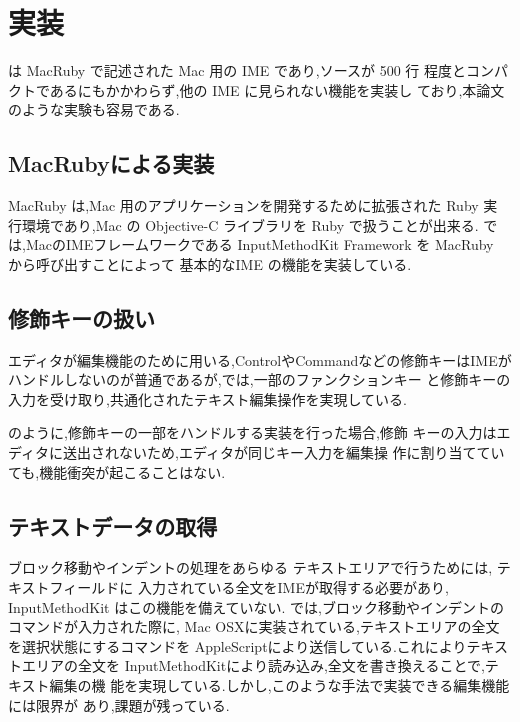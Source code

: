 \section{実装}

{\system} は MacRuby で記述された Mac 用の IME であり,ソースが 500 行
程度とコンパクトであるにもかかわらず,他の IME に見られない機能を実装し
ており,本論文のような実験も容易である.

\subsection{MacRubyによる実装}

MacRuby は,Mac 用のアプリケーションを開発するために拡張された Ruby 実
行環境であり,Mac の Objective-C ライブラリを Ruby で扱うことが出来る.
%
{\system} では,MacのIMEフレームワークである
InputMethodKit Framework を MacRuby から呼び出すことによって
基本的なIME の機能を実装している.

\subsection{修飾キーの扱い}

エディタが編集機能のために用いる,ControlやCommandなどの修飾キーはIMEが
ハンドルしないのが普通であるが,{\system}では,一部のファンクションキー
と修飾キーの入力を受け取り,共通化されたテキスト編集操作を実現している.

{\system} のように,修飾キーの一部をハンドルする実装を行った場合,修飾
キーの入力はエディタに送出されないため,エディタが同じキー入力を編集操
作に割り当てていても,機能衝突が起こることはない.

\subsection{テキストデータの取得}

ブロック移動やインデントの処理をあらゆる テキストエリアで行うためには,
テキストフィールドに 入力されている全文をIMEが取得する必要があり,
InputMethodKit はこの機能を備えていない.
%
{\system} では,ブロック移動やインデントのコマンドが入力された際に,
Mac OSXに実装されている,テキストエリアの全文を選択状態にするコマンドを
AppleScriptにより送信している.これによりテキストエリアの全文を
InputMethodKitにより読み込み,全文を書き換えることで,テキスト編集の機
能を実現している.しかし,このような手法で実装できる編集機能には限界が
あり,課題が残っている.
